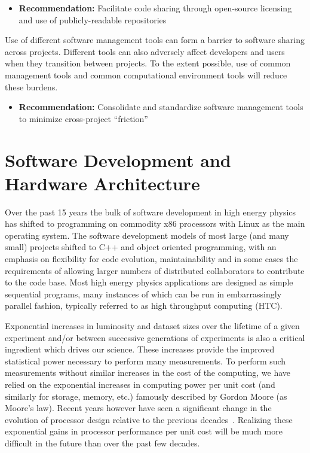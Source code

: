 \begin{itemize}
\item[] {\bf Recommendation:} 
Facilitate code sharing through open-source licensing and use of publicly-readable repositories
\end{itemize}

Use of different software management tools can form a barrier to software sharing across projects.
Different tools can also adversely affect developers and users when they
transition between projects.
To the extent possible, use of common management tools
and common computational environment tools will reduce these burdens.

\begin{itemize}
\item[] {\bf Recommendation:} 
Consolidate and standardize software management tools to minimize cross-project ``friction''
\end{itemize}



\section{Software Development and Hardware Architecture}
\label{CpFI4:sec:development}

Over the past 15 years the bulk of software development in high energy physics
has shifted to programming on commodity x86 processors with Linux as the
main operating
system. The software development models of most large (and many small) projects
shifted to C++ and object oriented programming, with an emphasis on flexibility
for code evolution, maintainability and in some cases the requirements of allowing larger
numbers of distributed collaborators to contribute to the code base. Most high
energy physics applications are designed as simple sequential programs,
many instances of which can be run in embarrassingly parallel fashion, typically
referred to as high throughput computing (HTC). 

Exponential increases in luminosity and dataset sizes over the lifetime of a
given experiment and/or between successive generations of experiments
is also a critical ingredient which drives our science. These increases provide
the improved statistical power necessary to perform many measurements.
To perform such measurements without similar increases in the cost of
the computing, we have relied on the exponential increases in computing
power per unit cost (and similarly for storage, memory, etc.) famously
described by Gordon Moore (as Moore's law). Recent years however have seen a
significant change in the evolution of processor design relative to the
previous decades~\cite{GAMEOVER}. Realizing these exponential gains
in processor performance per unit cost will be much more difficult in
the future than over the past few decades.

